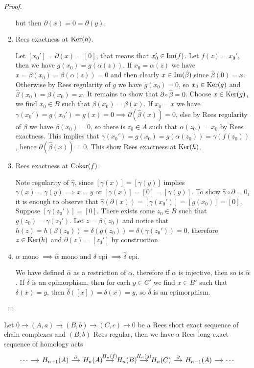 \begin{proof}[Proof]
\begin{enumerate}
        but then $\partial(x)=0=\partial(y)$.
        \item Rees exactness at $\mathrm{Ker}(h)$.\par
        Let $[x_0']=\partial(x)=[0]$, that means that $x_0'\in\mathrm{Im}(f)$. Let $f(z)=x_0'$, then we have $g(x_0)=g(\alpha(z))$.
        If $x_0=\alpha(z)$ we have $x=\beta(x_0)=\beta(\alpha(z))=0$ and then clearly $x\in\mathrm{Im}(\hat{\beta})$,since $\hat{\beta}(0)=x$.
        Otherwise by Rees regularity of $g$ we have $g(x_0)=0$, so $x_0\in\mathrm{Ker}(g)$ and $\hat{\beta}(x_0)=\beta(x_0)=x$.
        It remains to show that $\partial\circ\hat{\beta}=0$. Choose $x\in\mathrm{Ker}(g)$, we find $x_0\in B$ such that 
        $\beta(x_0)=\beta(x)$. If $x_0=x$ we have $\gamma(x_0')=g(x_0')=g(x)=0 \implies \partial(\hat{\beta}(x))=0$, else by Rees regularity
        of $\beta$ we have $\beta(x_0)=0$, so there is $z_0\in A$ such that $\alpha(z_0)=x_0$ by Rees exactness. This implies that 
        $\gamma(x_0')=g(x_0)=g(\alpha(z_0))=\gamma(f(z_0))$, hence $\partial(\hat{\beta}(x))=0$. This show Rees exactness at $\mathrm{Ker}(h)$. 
        \item Rees exactness at $\mathrm{Coker}(f)$.\par 
        Note regularity of $\hat{\gamma}$, since $[\gamma(x)]=[\gamma(y)]$ implies $\gamma(x)=\gamma(y)\implies x=y$ or 
        $[\gamma(x)]=[0]=[\gamma(y)]$. To show $\hat{\gamma}\circ\partial = 0$, it is enough to observe that 
        $\hat{\gamma}(\partial(x))=[\gamma(x_0')]=[g(x_0)]=[0]$. Suppose $[\gamma(z_0')]=[0]$. There exists some 
        $z_0\in B$ such that $g(z_0)=\gamma(z_0')$. Let $z = \beta(z_0)$ and notice that 
        $h(z) = h(\beta(z_0))= \delta(g(z_0))=\delta(\gamma(z_0'))=0$, therefore $z\in\mathrm{Ker}(h)$ and $\partial(z)=[z_0']$ by
        construction.
        \item $\alpha$ mono $\implies\hat{\alpha}$ mono and $\delta$ epi $\implies\hat{\delta}$ epi.\par 
        We have defined $\hat{\alpha}$ as a restriction of $\alpha$, therefore if $\alpha$ is injective, then so is $\hat{\alpha}$. 
        If $\delta$ is an epimorphism, then for each $y\in C'$ we find $x\in B'$ such that $\delta(x)=y$, then
        $\hat{\delta}([x]) = \delta(x) = y$, so $\hat{\delta}$ is an epimorphism.
        
    \end{enumerate}
\end{proof}
\begin{corollary}
    Let $0 \to (A,a) \to (B,b) \to (C,c) \to 0$ be a Rees short exact sequence of chain complexes and $(B,b)$ Rees regular, then 
    we have a Rees long exact sequence of homology acts 
    \[\begin{tikzcd}[sep=small]
        \cdots & {H_{n+1}(A)} & {H_n(A)} & {H_n(B)} & {H_n(C)} & {H_{n-1}(A)} & \cdots
        \arrow[from=1-1, to=1-2]
        \arrow["\partial", from=1-2, to=1-3]
        \arrow["{H_n(f)}", from=1-3, to=1-4]
        \arrow["{H_n(g)}", from=1-4, to=1-5]
        \arrow["\partial", from=1-5, to=1-6]
        \arrow[from=1-6, to=1-7]
    \end{tikzcd}\]
\end{corollary}
